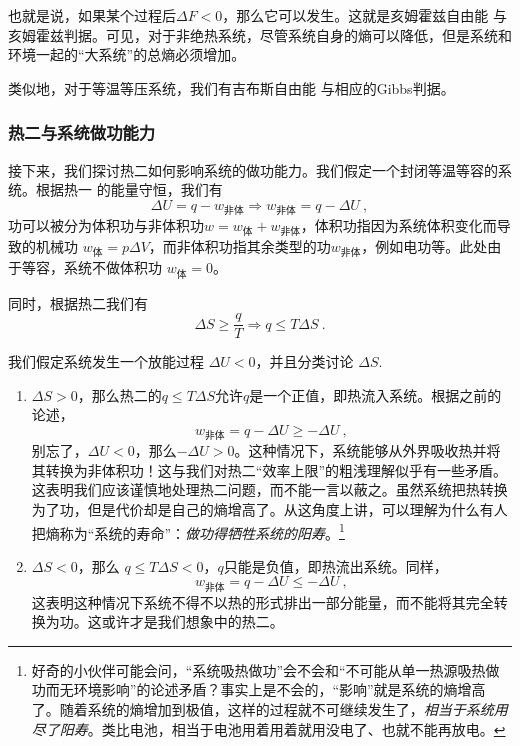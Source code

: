 也就是说，如果某个过程后$\Delta F < 0$，那么它可以发生。这就是亥姆霍兹自由能 与 亥姆霍兹判据。可见，对于非绝热系统，尽管系统自身的熵可以降低，但是系统和环境一起的“大系统”的总熵必须增加。

类似地，对于等温等压系统，我们有吉布斯自由能 与相应的Gibbs判据。

\subsubsection{热二与系统做功能力}
接下来，我们探讨热二如何影响系统的做功能力。我们假定一个封闭等温等容的系统。根据热一 的能量守恒，我们有
$$\Delta U = q - w_{\text{非体}} \Rightarrow w_{\text{非体}} = q - \Delta U ~,$$ 
功可以被分为体积功与非体积功$w = w_\text{体}+w_\text{非体}$，体积功指因为系统体积变化而导致的机械功  $w_\text{体}=p\Delta V$，而非体积功指其余类型的功$w_\text{非体}$，例如电功等。此处由于等容，系统不做体积功 $w_\text{体} = 0$。

同时，根据热二我们有
$$
\Delta S \ge \frac{q}{T} \Rightarrow q \le T \Delta S~.
$$

我们假定系统发生一个放能过程 $\Delta U < 0$，并且分类讨论 $\Delta S$.
\begin{enumerate}
\item $\Delta S > 0$，那么热二的$q \le T\Delta S$允许$q$是一个正值，即热流入系统。根据之前的论述，
$$
w_\text{非体} = q - \Delta U \ge - \Delta U 
~,
$$
别忘了，$\Delta U<0$，那么$-\Delta U>0$。这种情况下，系统能够从外界吸收热并将其转换为非体积功！这与我们对热二“效率上限”的粗浅理解似乎有一些矛盾。这表明我们应该谨慎地处理热二问题，而不能一言以蔽之。虽然系统把热转换为了功，但是代价却是自己的熵增高了。从这角度上讲，可以理解为什么有人把熵称为“系统的寿命”：\textsl{做功得牺牲系统的阳寿}。\footnote{好奇的小伙伴可能会问，“系统吸热做功”会不会和“不可能从单一热源吸热做功而无环境影响”的论述矛盾？事实上是不会的，“影响”就是系统的熵增高了。随着系统的熵增加到极值，这样的过程就不可继续发生了，\textsl{相当于系统用尽了阳寿}。类比电池，相当于电池用着用着就用没电了、也就不能再放电。}
\item $\Delta S < 0$，那么 $q \le T\Delta S < 0$，$q$只能是负值，即热流出系统。同样，
$$
w_\text{非体} = q - \Delta U \le - \Delta U 
~,
$$
这表明这种情况下系统不得不以热的形式排出一部分能量，而不能将其完全转换为功。这或许才是我们想象中的热二。
\end{enumerate}

